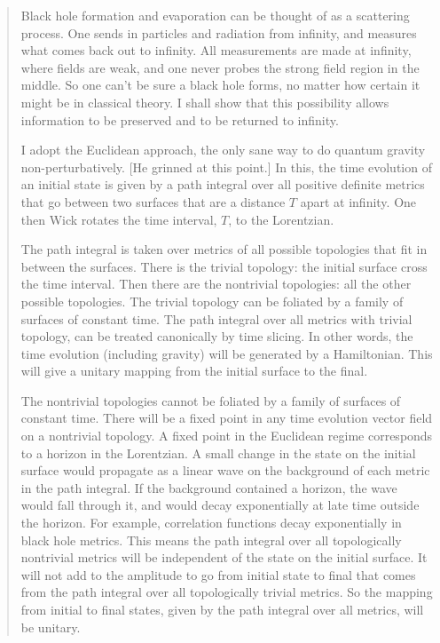 \documentclass{article}
\begin{document}
\begin{quote}
Black hole formation and evaporation can be thought of as a scattering
process. One sends in particles and radiation from infinity, and
measures what comes back out to infinity. All measurements are made at
infinity, where fields are weak, and one never probes the strong field
region in the middle. So one can't be sure a black hole forms, no matter
how certain it might be in classical theory. I shall show that this
possibility allows information to be preserved and to be returned to
infinity.

I adopt the Euclidean approach, the only sane way to do quantum gravity
non-perturbatively. {[}He grinned at this point.{]} In this, the time
evolution of an initial state is given by a path integral over all
positive definite metrics that go between two surfaces that are a
distance \(T\) apart at infinity. One then Wick rotates the time
interval, \(T\), to the Lorentzian.

The path integral is taken over metrics of all possible topologies that
fit in between the surfaces. There is the trivial topology: the initial
surface cross the time interval. Then there are the nontrivial
topologies: all the other possible topologies. The trivial topology can
be foliated by a family of surfaces of constant time. The path integral
over all metrics with trivial topology, can be treated canonically by
time slicing. In other words, the time evolution (including gravity)
will be generated by a Hamiltonian. This will give a unitary mapping
from the initial surface to the final.

The nontrivial topologies cannot be foliated by a family of surfaces of
constant time. There will be a fixed point in any time evolution vector
field on a nontrivial topology. A fixed point in the Euclidean regime
corresponds to a horizon in the Lorentzian. A small change in the state
on the initial surface would propagate as a linear wave on the
background of each metric in the path integral. If the background
contained a horizon, the wave would fall through it, and would decay
exponentially at late time outside the horizon. For example, correlation
functions decay exponentially in black hole metrics. This means the path
integral over all topologically nontrivial metrics will be independent
of the state on the initial surface. It will not add to the amplitude to
go from initial state to final that comes from the path integral over
all topologically trivial metrics. So the mapping from initial to final
states, given by the path integral over all metrics, will be unitary.


\end{quote}
\end{document}
